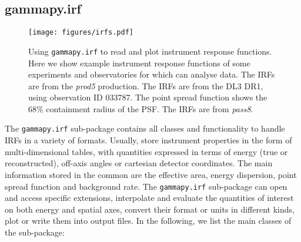 \documentclass[traditabstract, longauth]{aa}
\newcommand{\code}[1]{\texttt{#1}}
\begin{document}
\subsection{gammapy.irf}
\label{ssec:gammapy-irf}
%
%
\begin{figure*}[ht!]
	\centering
	\texttt{[image: figures/irfs.pdf]}
	\caption{
		Using \code{gammapy.irf} to read and plot instrument response functions.
		Here we show example instrument response functions of some experiments and
        observatories for which \gammapy can analyse data. The \cta IRFs
        are from the \textit{prod5} production. The \hess IRFs are from the DL3 DR1,
        using observation ID 033787. The point spread function shows the 68\%
        containment radius of the PSF. The \fermi IRFs are from \textit{pass8}.
    }
	\label{fig:irfs}
\end{figure*}
%
%
The \code{gammapy.irf} sub-package contains all classes and functionality
to handle IRFs in a variety of formats.
Usually, \irfs store instrument properties in the form of multi-dimensional
tables, with quantities expressed in terms of energy (true or reconstructed),
off-axis angles or cartesian detector coordinates. The main information stored in
the common \gammaray \irfs are the effective area, energy dispersion,
point spread function and background rate. The \code{gammapy.irf}
sub-package can open and access specific \irf extensions,
interpolate and evaluate the quantities of interest on both energy and spatial
axes, convert their format or units in different kinds, plot or write them into
output files. In the following, we list the main classes of the
sub-package:
\end{document}
